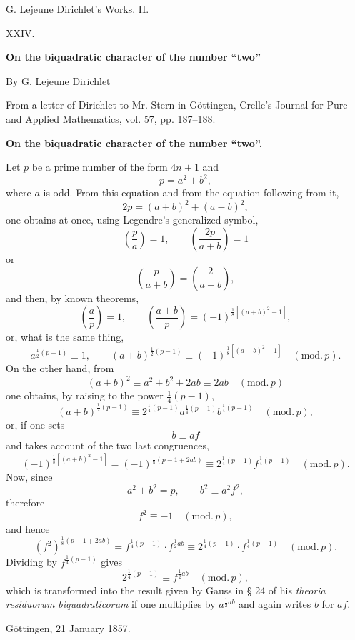 \documentclass[11pt]{article}
\begin{document}
\begin{center}
{\Large G. Lejeune Dirichlet's Works. II.}\par\vspace{1.2em}
{\Large XXIV.}\par\vspace{0.5em}
{\LARGE \textbf{On the biquadratic character of the number ``two''}}\par\vspace{1em}
{\large By G. Lejeune Dirichlet}\par\vspace{0.5em}
{\small From a letter of Dirichlet to Mr. Stern in Göttingen, Crelle's Journal for Pure and Applied Mathematics, vol. 57, pp. 187--188.}
\end{center}

\bigskip
\begin{center}
{\large \textbf{On the biquadratic character of the number ``two''.}}
\end{center}

Let $p$ be a prime number of the form $4n+1$ and
\[
p=a^2+b^2,
\]
where $a$ is odd. From this equation and from the equation following from it,
\[
2p=(a+b)^2+(a-b)^2,
\]
one obtains at once, using Legendre's generalized symbol,
\[
\left(\frac{p}{a}\right)=1, \qquad \left(\frac{2p}{a+b}\right)=1
\]
or
\[
\left(\frac{p}{a+b}\right)=\left(\frac{2}{a+b}\right),
\]
and then, by known theorems,
\[
\left(\frac{a}{p}\right)=1, \qquad \left(\frac{a+b}{p}\right)=(-1)^{\frac18[(a+b)^2-1]},
\]
or, what is the same thing,
\[
a^{\frac12(p-1)}\equiv 1, \qquad (a+b)^{\frac12(p-1)}\equiv (-1)^{\frac18[(a+b)^2-1]} \quad (\mathrm{mod}.\,p).
\]
On the other hand, from
\[
(a+b)^2 \equiv a^2+b^2+2ab \equiv 2ab \quad (\mathrm{mod}.\,p)
\]
one obtains, by raising to the power $\frac14(p-1)$,
\[
(a+b)^{\frac12(p-1)}\equiv 2^{\frac14(p-1)}a^{\frac14(p-1)}b^{\frac14(p-1)} \quad (\mathrm{mod}.\,p),
\]
or, if one sets
\[
b\equiv af
\]
and takes account of the two last congruences,
\[
(-1)^{\frac18[(a+b)^2-1]}=(-1)^{\frac18(p-1+2ab)}\equiv 2^{\frac14(p-1)}f^{\frac14(p-1)} \quad (\mathrm{mod}.\,p).
\]
Now, since
\[
a^2+b^2=p, \qquad b^2\equiv a^2f^2,
\]
therefore
\[
f^2\equiv -1 \quad (\mathrm{mod}.\,p),
\]
and hence
\[
(f^2)^{\frac18(p-1+2ab)}=f^{\frac14(p-1)}\cdot f^{\frac12 ab}\equiv 2^{\frac14(p-1)}\cdot f^{\frac14(p-1)} \quad (\mathrm{mod}.\,p).
\]
Dividing by $f^{\frac14(p-1)}$ gives
\[
2^{\frac14(p-1)}\equiv f^{\frac12 ab} \quad (\mathrm{mod}.\,p),
\]
which is transformed into the result given by Gauss in § 24 of his \emph{theoria residuorum biquadraticorum} if one multiplies by $a^{\frac12ab}$ and again writes $b$ for $af$.

\begin{center}
Göttingen, 21 January 1857.
\end{center}
\end{document}
